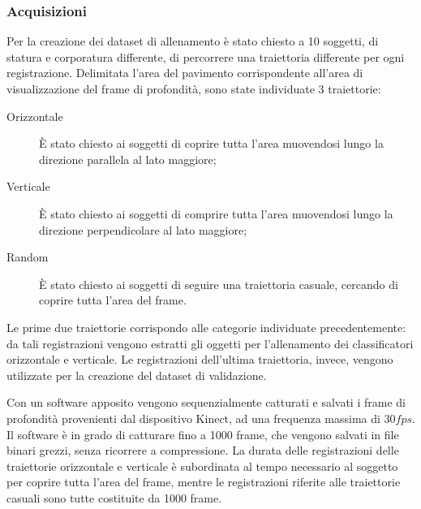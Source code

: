             \subsubsection{Acquisizioni}
                Per la creazione dei dataset di allenamento è stato chiesto a 10 soggetti, di statura e corporatura differente, di percorrere una traiettoria differente per ogni registrazione.
                Delimitata l'area del pavimento corrispondente all'area di visualizzazione del frame di profondità, sono state individuate 3 traiettorie:
                \begin{description}
                    \item[Orizzontale] È stato chiesto ai soggetti di coprire tutta l'area muovendosi lungo la direzione parallela al lato maggiore;
                    \item[Verticale] È stato chiesto ai soggetti di comprire tutta l'area muovendosi lungo la direzione perpendicolare al lato maggiore;
                    \item[Random] È stato chiesto ai soggetti di seguire una traiettoria casuale, cercando di coprire tutta l'area del frame.
                \end{description}
                Le prime due traiettorie corrispondo alle categorie individuate precedentemente: da tali registrazioni vengono estratti gli oggetti per l'allenamento dei classificatori orizzontale e verticale.
                Le registrazioni dell'ultima traiettoria, invece, vengono utilizzate per la creazione del dataset di validazione.

                Con un software apposito %
                vengono sequenzialmente catturati e salvati i frame di profondità provenienti dal dispositivo Kinect, ad una frequenza massima di $30 fps$.
                Il software è in grado di catturare fino a 1000 frame, che vengono salvati in file binari grezzi, senza ricorrere a compressione.
                La durata delle registrazioni delle traiettorie orizzontale e verticale è subordinata al tempo necessario al soggetto per coprire tutta l'area del frame, mentre le registrazioni riferite alle traiettorie casuali sono tutte costituite da 1000 frame.

